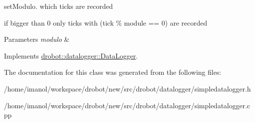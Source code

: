 set\-Modulo. which ticks are recorded 

if bigger than 0 only ticks with (tick \% module == 0) are recorded 
\begin{DoxyParams}{Parameters}
{\em modulo} & \\
\hline
\end{DoxyParams}


Implements \hyperlink{classdrobot_1_1datalogger_1_1DataLogger_ae463aebd8cb38c716bef83d5732042b1}{drobot\-::datalogger\-::\-Data\-Logger}.



The documentation for this class was generated from the following files\-:\begin{DoxyCompactItemize}
\item 
/home/imanol/workspace/drobot/new/src/drobot/datalogger/simpledatalogger.\-h\item 
/home/imanol/workspace/drobot/new/src/drobot/datalogger/simpledatalogger.\-cpp\end{DoxyCompactItemize}
